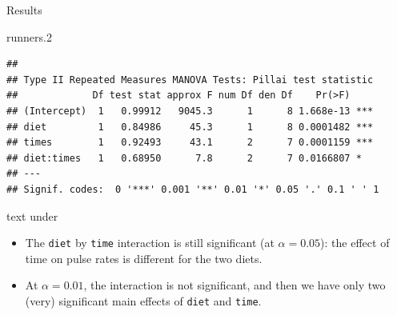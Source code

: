 \documentclass[
  ignorenonframetext,
]{beamer}
\newenvironment{Shaded}{\begin{snugshade}}{\end{snugshade}}
\newcommand{\FloatTok}[1]{\textcolor[rgb]{0.00,0.00,0.81}{#1}}
\newcommand{\NormalTok}[1]{#1}
\begin{document}
\begin{frame}[fragile]{Results}
\protect\hypertarget{results-2}{}

\scriptsize

\begin{Shaded}
\begin{Highlighting}[]
\NormalTok{runners}\FloatTok{.2}
\end{Highlighting}
\end{Shaded}

\begin{verbatim}
## 
## Type II Repeated Measures MANOVA Tests: Pillai test statistic
##             Df test stat approx F num Df den Df    Pr(>F)    
## (Intercept)  1   0.99912   9045.3      1      8 1.668e-13 ***
## diet         1   0.84986     45.3      1      8 0.0001482 ***
## times        1   0.92493     43.1      2      7 0.0001159 ***
## diet:times   1   0.68950      7.8      2      7 0.0166807 *  
## ---
## Signif. codes:  0 '***' 0.001 '**' 0.01 '*' 0.05 '.' 0.1 ' ' 1
\end{verbatim}

\normalsize

text under

\begin{itemize}
\item
  The \texttt{diet} by \texttt{time} interaction is still significant
  (at \(\alpha=0.05\)): the effect of time on pulse rates is different
  for the two diets.
\item
  At \(\alpha=0.01\), the interaction is not significant, and then we
  have only two (very) significant main effects of \texttt{diet} and
  \texttt{time}.
\end{itemize}

\end{frame}
\end{document}
